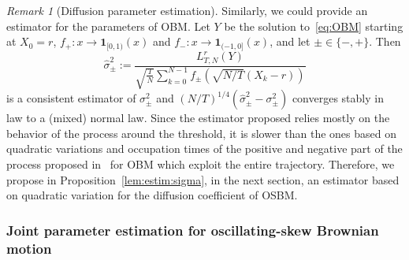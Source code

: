 \documentclass[12pt]{article}
\numberwithin{equation}{section}
\newtheorem{proposition}{Proposition}
\theoremstyle{definition}
\theoremstyle{remark}
\newtheorem{remark}{Remark}
\newcommand{\ind}[1]{\mathbf{1}_{#1}}
\begin{document}
\begin{remark}[Diffusion parameter estimation]
Similarly, we could provide an estimator for the parameters of OBM.
Let $Y$ be the solution to~\eqref{eq:OBM} starting at $X_0=r$, $f_+ \colon x \to \ind{[0,1)}(x)$ and $f_- \colon x \to \ind{(-1,0]}(x)$, and let $\pm\in \{-,+\}$. 
Then
\begin{equation}
\hat{\sigma}_\pm^2 
	:= %
	\frac{L^r_{T,N}(Y)}{ \sqrt{\frac{T}{N}} \sum_{k=0}^{N -1} f_\pm (\sqrt{N/T}(X_{k}-r))  }
\end{equation}
is a consistent estimator of $\sigma_\pm^2$ and 
$(N/T)^{1/4} \left( \hat{\sigma}_\pm^2   - \sigma_\pm^2 \right)$  
converges stably in law to 
a
(mixed) normal law.
%
Since the estimator proposed relies mostly on the behavior of the process around the threshold, it is slower than the ones based on quadratic variations and occupation times of the positive and negative part of the process proposed in~\cite{lp} for OBM which exploit the entire trajectory.
Therefore, we propose in Proposition~\ref{lem:estim:sigma}, in the next section, an estimator based on quadratic variation for the diffusion coefficient of OSBM.
\end{remark}

\subsubsection{Joint parameter estimation for oscillating-skew Brownian motion}
\end{document}
